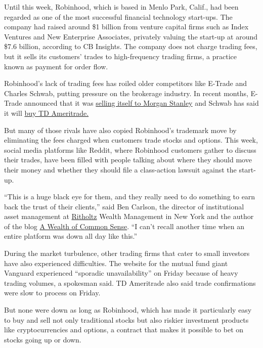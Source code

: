 Until this week, Robinhood, which is based in Menlo Park, Calif., had
been regarded as one of the most successful financial technology
start-ups. The company had raised around \$1 billion from venture
capital firms such as Index Ventures and New Enterprise Associates,
privately valuing the start-up at around \$7.6 billion, according to CB
Insights. The company does not charge trading fees, but it sells its
customers' trades to high-frequency trading firms, a practice known as
payment for order flow.

Robinhood's lack of trading fees has roiled older competitors like
E-Trade and Charles Schwab, putting pressure on the brokerage industry.
In recent months, E-Trade announced that it was
\href{https://www.nytimes3xbfgragh.onion/2020/02/20/business/morgan-stanley-etrade.html}{selling
itself to Morgan Stanley} and Schwab has said it will
\href{https://www.nytimes3xbfgragh.onion/2019/11/25/business/dealbook/charles-schwab-td-ameritrade.html}{buy
TD Ameritrade.}

But many of those rivals have also copied Robinhood's trademark move by
eliminating the fees charged when customers trade stocks and options.
This week, social media platforms like Reddit, where Robinhood customers
gather to discuss their trades, have been filled with people talking
about where they should move their money and whether they should file a
class-action lawsuit against the start-up.

``This is a huge black eye for them, and they really need to do
something to earn back the trust of their clients,'' said Ben Carlson,
the director of institutional asset management at
\href{https://ritholtzwealth.com/}{Ritholtz} Wealth Management in New
York and the author of the blog
\href{https://awealthofcommonsense.com/}{A Wealth of Common Sense}. ``I
can't recall another time when an entire platform was down all day like
this.''

During the market turbulence, other trading firms that cater to small
investors have also experienced difficulties. The website for the mutual
fund giant Vanguard experienced ``sporadic unavailability'' on Friday
because of heavy trading volumes, a spokesman said. TD Ameritrade also
said trade confirmations were slow to process on Friday.

But none were down as long as Robinhood, which has made it particularly
easy to buy and sell not only traditional stocks but also riskier
investment products like cryptocurrencies and options, a contract that
makes it possible to bet on stocks going up or down.

